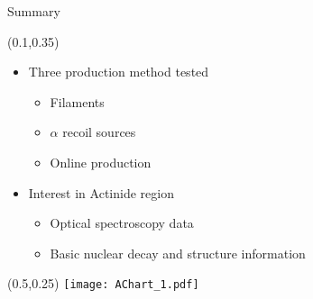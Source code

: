 \documentclass[10pt,aspectratio=169]{beamer}
\begin{document}
\begin{frame}{Summary}
	\begin{textblock*}{0.4\paperwidth}(0.1\paperwidth,0.35\paperheight)
		\centering
		\begin{itemize}
					\item[]{Three production method tested\\
								\begin{itemize}
									\item Filaments
									\item $\alpha$ recoil sources
									\item Online production 
								\end{itemize}
							}
					\item[]{Interest in Actinide region\\
								\begin{itemize}
									\item Optical spectroscopy data
									\item Basic nuclear decay and structure information
								\end{itemize}							
					}
		\end{itemize}
	\end{textblock*}
	\begin{textblock*}{0.4\paperwidth}(0.5\paperwidth,0.25\paperheight)
		\centering
		\texttt{[image: AChart\_1.pdf]}

	\end{textblock*}
\end{frame}
\end{document}
